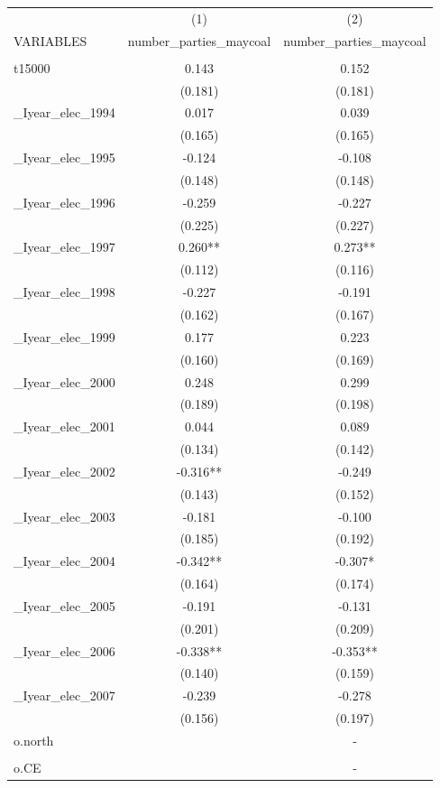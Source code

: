\documentclass[]{article}
\begin{document}
\begin{tabular}{lcc} \hline
 & (1) & (2) \\
VARIABLES & number\_parties\_maycoal & number\_parties\_maycoal \\ \hline
 &  &  \\
t15000 & 0.143 & 0.152 \\
 & (0.181) & (0.181) \\
\_Iyear\_elec\_1994 & 0.017 & 0.039 \\
 & (0.165) & (0.165) \\
\_Iyear\_elec\_1995 & -0.124 & -0.108 \\
 & (0.148) & (0.148) \\
\_Iyear\_elec\_1996 & -0.259 & -0.227 \\
 & (0.225) & (0.227) \\
\_Iyear\_elec\_1997 & 0.260** & 0.273** \\
 & (0.112) & (0.116) \\
\_Iyear\_elec\_1998 & -0.227 & -0.191 \\
 & (0.162) & (0.167) \\
\_Iyear\_elec\_1999 & 0.177 & 0.223 \\
 & (0.160) & (0.169) \\
\_Iyear\_elec\_2000 & 0.248 & 0.299 \\
 & (0.189) & (0.198) \\
\_Iyear\_elec\_2001 & 0.044 & 0.089 \\
 & (0.134) & (0.142) \\
\_Iyear\_elec\_2002 & -0.316** & -0.249 \\
 & (0.143) & (0.152) \\
\_Iyear\_elec\_2003 & -0.181 & -0.100 \\
 & (0.185) & (0.192) \\
\_Iyear\_elec\_2004 & -0.342** & -0.307* \\
 & (0.164) & (0.174) \\
\_Iyear\_elec\_2005 & -0.191 & -0.131 \\
 & (0.201) & (0.209) \\
\_Iyear\_elec\_2006 & -0.338** & -0.353** \\
 & (0.140) & (0.159) \\
\_Iyear\_elec\_2007 & -0.239 & -0.278 \\
 & (0.156) & (0.197) \\
o.north &  & - \\
 &  &  \\
o.CE &  & - \\

\end{tabular}
\end{document}
